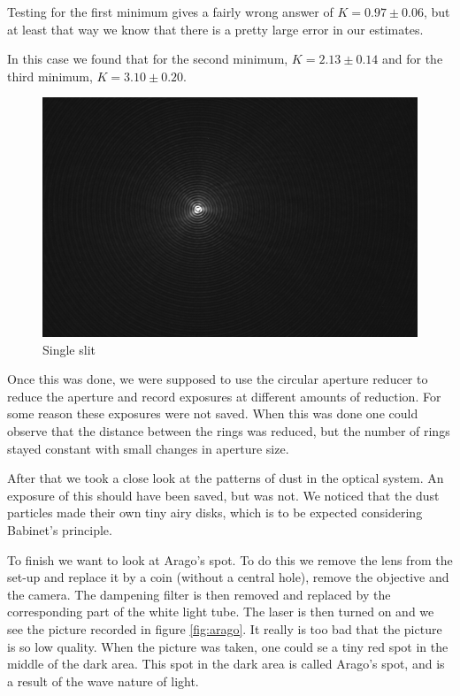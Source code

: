 \documentclass[a4paper,12pt]{article}
\begin{document}
Testing for the first minimum gives a fairly wrong answer of $K = 0.97 \pm 0.06$, but at least that way we know that there is a pretty large error in our estimates.

In this case we found that for the second minimum, $K = 2.13 \pm 0.14$ and for the third minimum, $K = 3.10 \pm 0.20$. 

\begin{figure}
	\centering
	\includegraphics[width=\textwidth]{airy}
	\caption{Single slit}\label{fig:airy}
\end{figure}

Once this was done, we were supposed to use the circular aperture reducer to reduce the aperture and record exposures at different amounts of reduction. For some reason these exposures were not saved. When this was done one could observe that the distance between the rings was reduced, but the number of rings stayed constant with small changes in aperture size. 

After that we took a close look at the patterns of dust in the optical system. An exposure of this should have been saved, but was not. We noticed that the dust particles made their own tiny airy disks, which is to be expected considering Babinet's principle.

To finish we want to look at Arago's spot. To do this we remove the lens from the set-up and replace it by a coin (without a central hole), remove the objective and the camera. The dampening filter is then removed and replaced by the corresponding part of the white light tube. The laser is then turned on and we see the picture recorded in figure \ref{fig:arago}. It really is too bad that the picture is so low quality. When the picture was taken, one could se a tiny red spot in the middle of the dark area. This spot in the dark area is called Arago's spot, and is a result of the wave nature of light. 
\end{document}
